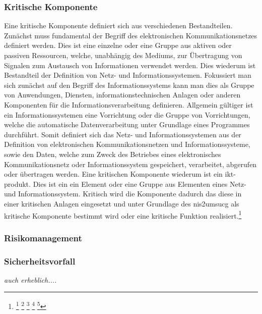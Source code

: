 \documentclass[11pt,a4paper,hidelinks]{article}   %
\begin{document}
            \subsubsection{Kritische Komponente}
            Eine kritische Komponente definiert sich aus verschiedenen Bestandteilen. Zunächst muss fundamental der Begriff des elektronischen Kommunikationsnetzes definiert werden. Dies ist eine einzelne oder eine Gruppe aus aktiven oder passiven Ressourcen, welche, unabhängig des Mediums, zur Übertragung von Signalen zum Austausch von Informationen verwendet werden. Dies wiederum ist Bestandteil der Definition von Netz- und Informationssystemen. Fokussiert man sich zunächst auf den Begriff des Informationssystems kann man dies als Gruppe von Anwendungen, Diensten, informationstechnischen Anlagen oder anderen Komponenten für die Informationsverarbeitung definieren. Allgemein gültiger ist ein Informationssystemen eine Vorrichtung oder die Gruppe von Vorrichtungen, welche die automatische Datenverarbeitung unter Grundlage eines Programmes durchführt. Somit definiert sich das Netz- und Informationssystemen aus der Definition von elektronischen Kommunikationsnetzen und Informationssysteme, sowie den Daten, welche zum Zweck des Betriebes eines elektronisches Kommunikationsnetz oder Informationssystem gespeichert, verarbeitet, abgerufen oder übertragen werden. Eine kritischen Komponente wiederum ist ein \gls{ikt-produkt}. Dies ist ein ein Element oder eine Gruppe aus Elementen eines Netz- und Informationssystem. Kritisch wird die Komponente dadurch das diese in einer kritischen Anlagen eingesetzt und unter Grundlage des \gls{nis2umsucg} als kritische Komponente bestimmt wird oder eine kritische Funktion realisiert.\footnote{
                \footcite[Vgl. §2 Nummer 23][]{NIS2UmsuCG}
                \footcite[Vgl. Artikel 4, Nummer 1][]{EU2016-1148}
                \footcite[Vgl. Artikel 2, Buchstabe a][]{EU2002-21-EG}
                \footcite[Vgl. Artikel 2, Nummer 12][]{EU2019-881}
                \footcite[Vgl. S. 5][]{iso27000-2018}
            }

            \subsubsection{Risikomanagement}

            \subsubsection{Sicherheitsvorfall}
            \emph{auch erheblich....}
\end{document}
